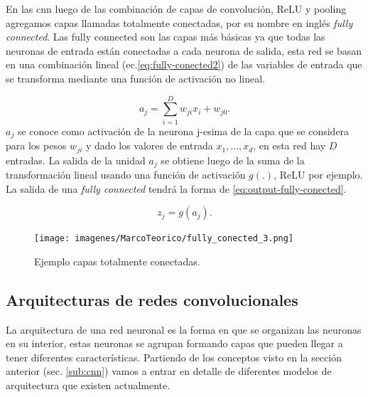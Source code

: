 En las \ac{cnn} luego de las combinación de capas de convolución, ReLU y pooling agregamos capas llamadas totalmente conectadas, por su nombre en inglés \textit{fully connected}.
Las fully connected son las capas más básicas ya que todas las neuronas de entrada están conectadas a cada neurona de salida, esta red se basan en una combinación lineal (ec.\eqref{eq:fully-conected2}) de las variables de entrada que se transforma mediante una función de activación no lineal.


\begin{equation}\label{eq:fully-conected2}
a_j = \sum_{i=1}^D w_{ji}  x_i + w_{j0}.
\end{equation}
$ a_j$  se conoce como activación de la neurona j-esima de la capa que se considera para los pesos $w_{ji}$ y dado los valores de entrada ${x_1,...,x_d}$, en esta red hay  $ D$ entradas. La salida de la unidad  $ a_j$ se obtiene luego de la suma de la transformación lineal usando una función de activación $ g(.)$, ReLU por ejemplo. La salida de una \textit{fully connected} tendrá la forma de  \eqref{eq:output-fully-conected}.

\begin{equation}\label{eq:output-fully-conected}
z_j = g(a_j).
\end{equation}


\begin{figure}[H]
 \centering
  \texttt{[image: imagenes/MarcoTeorico/fully\_conected\_3.png]}
  \caption{Ejemplo capas totalmente conectadas.} 
  \label{Fig:relu}
\end{figure}


\subsection{Arquitecturas de redes convolucionales}\label{sub:arquitecturacnn}
La arquitectura de una red neuronal es la forma en que se organizan  las neuronas en su interior, estas neuronas se agrupan formando capas que pueden llegar a tener diferentes características. Partiendo de los conceptos visto en la sección anterior (sec. \ref{sub:cnn})  vamos a entrar en detalle de diferentes modelos de arquitectura que existen actualmente.

